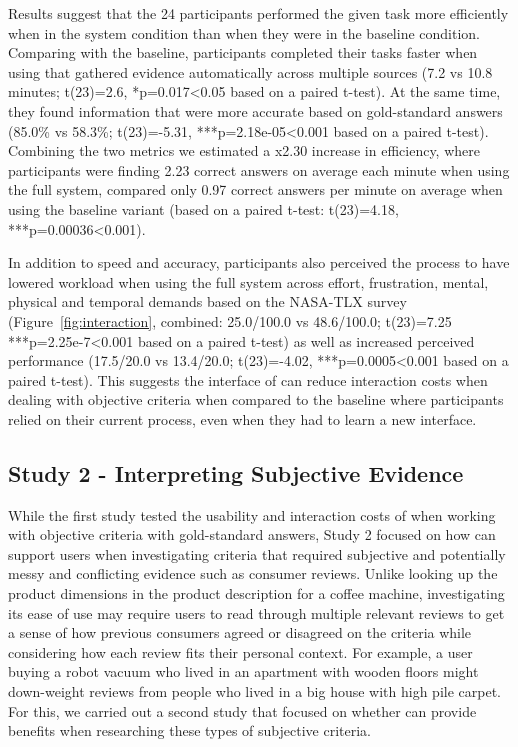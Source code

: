 Results suggest that the 24 participants performed the given task more efficiently when in the system condition than when they were in the baseline condition. Comparing \SYSTEM with the baseline, participants completed their tasks faster when using \SYSTEM that gathered evidence automatically across multiple sources (7.2 vs 10.8 minutes; t(23)=2.6, *p=0.017<0.05 based on a paired t-test). At the same time, they found information that were more accurate based on gold-standard answers (85.0\% vs 58.3\%; t(23)=-5.31, ***p=2.18e-05<0.001 based on a paired t-test). Combining the two metrics we estimated a x2.30 increase in efficiency, where participants were finding 2.23 correct answers on average each minute when using the full \SYSTEM system, compared only 0.97 correct answers per minute on average when using the baseline variant (based on a paired t-test: t(23)=4.18, ***p=0.00036<0.001).

In addition to speed and accuracy, participants also perceived the process to have lowered workload when using the full system across effort, frustration, mental, physical and temporal demands based on the NASA-TLX survey (Figure~\ref{fig:interaction}, combined: 25.0/100.0 vs 48.6/100.0; t(23)=7.25 ***p=2.25e-7<0.001 based on a paired t-test)  as well as increased perceived performance (17.5/20.0 vs 13.4/20.0; t(23)=-4.02, ***p=0.0005<0.001 based on a paired t-test). This suggests the interface of \SYSTEM can reduce interaction costs when dealing with objective criteria when compared to the baseline where participants relied on their current process, even when they had to learn a new interface.



\subsection{Study 2 - Interpreting Subjective Evidence}

While the first study tested the usability and interaction costs of \SYSTEM when working with objective criteria with gold-standard answers, Study 2 focused on how \SYSTEM can support users when investigating criteria that required subjective and potentially messy and conflicting evidence such as consumer reviews\cite{hoch1986consumer}. Unlike looking up the product dimensions in the product description for a coffee machine, investigating its ease of use may require users to read through multiple relevant reviews to get a sense of how previous consumers agreed or disagreed on the criteria while considering how each review fits their personal context. For example, a user buying a robot vacuum who lived in an apartment with wooden floors might down-weight reviews from people who lived in a big house with high pile carpet. For this, we carried out a second study that focused on whether \SYSTEM can provide benefits when researching these types of subjective criteria. 

